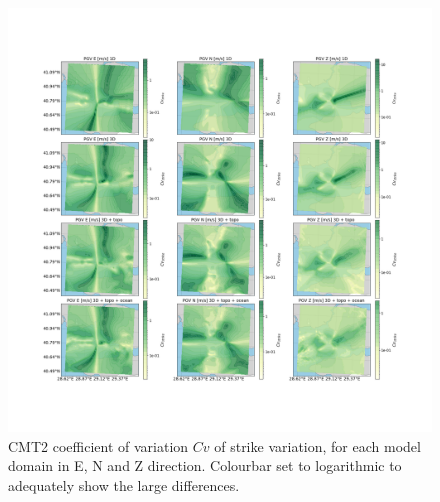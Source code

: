 \documentclass[../Text/00main.tex]{subfiles}
\begin{document}
\begin{figure}
    \centering
    \includegraphics[width=1\linewidth,trim = 2cm 5cm 1cm 5cm, clip]{images_results/strike_variation_sigma_sc2.png}
    \caption{CMT2 coefficient of variation $Cv$ of strike variation, for each model domain in E, N and Z direction. Colourbar set to logarithmic to adequately show the large differences.}
    \label{fig:cmt2sigm}
\end{figure}
\end{document}
